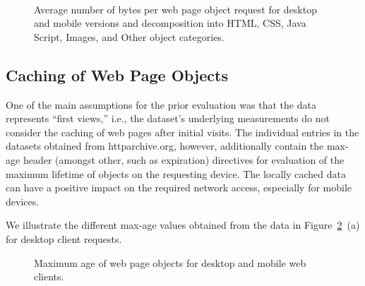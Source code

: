 \documentclass[onecolumn,12pt]{IEEEtran}
\begin{document}
\begin{figure}
	\\
	\caption{Average number of bytes per web page object request for desktop and mobile versions and decomposition into  HTML, CSS, Java Script, Images, and Other object categories.\label{fig:relative}}
\end{figure}

\newpage
\subsection{Caching of Web Page Objects}
One of the main assumptions for the prior evaluation was that the data represents ``first views,'' i.e., the dataset's underlying measurements do not consider the caching of web pages after initial visits. 
The individual entries in the datasets obtained from httparchive.org, however, additionally contain the max-age header (amongst other, such as expiration) directives for evaluation of the maximum lifetime of objects on the requesting device. The locally cached data can have a positive impact on the required network access, especially for mobile devices.

We illustrate the different max-age values obtained from the data in Figure~\ref{fig:maxage}~(a) for desktop client requests.
\begin{figure}
	\centering
	\caption{Maximum age of web page objects for desktop and mobile web clients.\label{fig:maxage}}
\end{figure}
\end{document}
